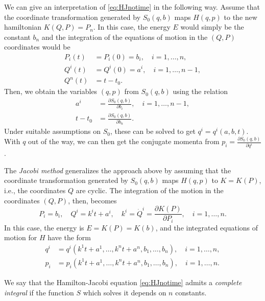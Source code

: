 \documentclass[english,fontsize=11pt,paper=a5,oneside]{scrbook}
\newcommand{\R}{\mathbb{R}}
\theoremstyle{definition}
\begin{document}
We can give an interpretation of \eqref{eq:HJnotime} in the following way.
Assume that the coordinate transformation generated by $S_0(q,b)$ maps $H(q,p)$ to the new hamiltonian $K(Q,P)=P_n$.
In this case, the energy $E$ would simply be the constant $b_n$ and the integration of the equations of motion in the $(Q,P)$ coordinates would be
\begin{align}
  P_i(t) & = P_i(0) = b_i, \quad i=1,\ldots,n,   \\
  Q^i(t) & = Q^i(0) = a^i, \quad i=1,\ldots,n-1, \\
  Q^n(t) & = t- t_0.
\end{align}
Then, we obtain the variables $(q,p)$ from $S_0(q,b)$ using the relation
\begin{align}
  a^i   & = \frac{\partial S_0(q,b)}{\partial b_i}, \quad i=1,\ldots,n-1, \\
  t-t_0 & = \frac{\partial S_0(q,b)}{\partial b_n}.
\end{align}
Under suitable assumptions on $S_0$, these can be solved to get $q^i = q^i(a,b,t)$. With $q$ out of the way, we can then get the conjugate momenta from $p_i = \frac{\partial S_0(q,b)}{\partial q^i}$.

The \emph{Jacobi method} generalizes the approach above by assuming that the coordinate transformation generated by $S_0(q,b)$ maps $H(q,p)$ to $K = K(P)$, i.e., the coordinates $Q$ are cyclic.
The integration of the motion in the coordinates $(Q,P)$, then, becomes
\begin{equation}\label{eq:JacobiM}
  P_i = b_i, \quad
  Q^i = k^i t + a^i, \quad
  k^i = \dot Q^i = \frac{\partial K(P)}{\partial P_i}, \quad
  i = 1,\ldots,n.
\end{equation}
In this case, the energy is $E = K(P) = K(b)$, and the integrated equations of motion for $H$ have the form
\begin{align}
  q^i & = q^i(k^1 t + a^1, \ldots, k^n t + a^n, b_1, \ldots, b_n), \quad i=1,\ldots,n, \\
  p_i & = p_i(k^1 t + a^1, \ldots, k^n t + a^n, b_1, \ldots, b_n), \quad i=1,\ldots,n.
\end{align}

\begin{tcolorbox}
  We say that the Hamilton-Jacobi equation \eqref{eq:HJnotime} admits a \emph{complete integral} if the function $S$ which solves it depends on $n$ constants.
\end{tcolorbox}

\end{document}
